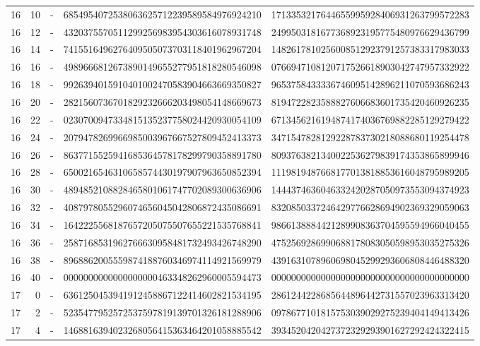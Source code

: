 \begin{longtable}{rrrll}
16 & 10 & - & 6854954072538063625712239589584976924210 & 1713353217644655995928406931263799572283 \\
16 & 12 & - & 4320375570511299256983954303616078931748 & 2499503181677368923195775480976629436799 \\
16 & 14 & - & 7415516496276409505073703118401962967204 & 1482617810256008512923791257383317983033 \\
16 & 16 & - & 4989666812673890149655277951818280546098 & 0766947108120717526618903042747957332922 \\
16 & 18 & - & 9926394015910401002470583904663669350827 & 9653758433336746095142896211070593686243 \\
16 & 20 & - & 2821560736701829232666203498054148669673 & 8194722823588827606683601735420460926235 \\
16 & 22 & - & 0230700947334815135237758024420930054109 & 6713456216194874174036769882285129279422 \\
16 & 24 & - & 2079478269966985003967667527809452413373 & 3471547828129228783730218088680119254478 \\
16 & 26 & - & 8637715525941685364578178299790358891780 & 8093763821340022536279839174353865899946 \\
16 & 28 & - & 6500216546310658574430197907963650852394 & 1119819487668177013818853616048795989205 \\
16 & 30 & - & 4894852108828465801061747702089300636906 & 1444374636046332420287050973553094374923 \\
16 & 32 & - & 4087978055296074656045042806872435086691 & 8320850337246429776628694902369329059063 \\
16 & 34 & - & 1642225568187657205075507655221535768841 & 9866138884421289908363704595594966040455 \\
16 & 36 & - & 2587168531962766630958481732493426748290 & 4752569286990688178083050598953035275326 \\
16 & 38 & - & 8968862005559874188760346974114921569979 & 4391631078960698045299293606808446488320 \\
16 & 40 & - & 0000000000000000000463348262960005594473 & 0000000000000000000000000000000000000000 \\
17 & 0 & - & 6361250453941912458867122414602821534195 & 2861244228685644896442731557023963313420 \\
17 & 2 & - & 5235477952572537597819139701326181288906 & 0978677101815753039029275239404149413426 \\
17 & 4 & - & 1468816394023268056415363464201058885542 & 3934520420427372329293901627292424322415 \\

\end{longtable}
